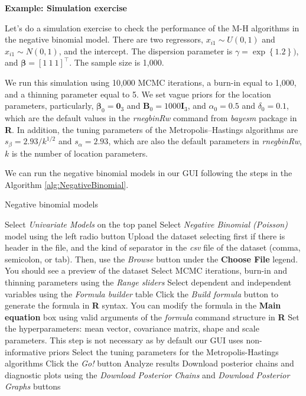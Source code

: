 \textbf{Example: Simulation exercise}

Let's do a simulation exercise to check the performance of the M-H algorithms in the negative binomial model. There are two regressors, $x_{i1}\sim U(0,1)$ and $x_{i1}\sim N(0,1)$, and the intercept. The dispersion parameter is $\gamma=\exp\left\{1.2\right\})$, and $\bm{\beta}=\left[1 \ 1 \ 1\right]^{\top}$. The sample size is 1,000.

We run this simulation using 10,000 MCMC iterations, a burn-in  equal to 1,000, and a thinning parameter equal to 5. We set vague priors for the location parameters, particularly,  $\bm{\beta}_0=\bm{0}_{3}$ and $\bm{B}_0=1000\bm{I}_{3}$, and $\alpha_0=0.5$ and $\delta_0=0.1$, which are the default values in the \textit{rnegbinRw} command from \textit{bayesm} package in \textbf{R}. In addition, the tuning parameters of the Metropolis--Hastings algorithms are $s_{\beta}=2.93/k^{1/2}$ and $s_{\alpha}=2.93$, which are also the default parameters in \textit{rnegbinRw}, $k$ is the number of location parameters.

We can run the negative binomial models in our GUI following the steps in the Algorithm \ref{alg:NegativeBinomial}.

\begin{algorithm}[h!]
	\caption{Negative binomial models}\label{alg:NegativeBinomial}
	\begin{algorithmic}[1]  		 			
		\State Select \textit{Univariate Models} on the top panel
		\State Select \textit{Negative Binomial (Poisson)} model using the left radio button
		\State Upload the dataset selecting first if there is header in the file, and the kind of separator in the \textit{csv} file of the dataset (comma, semicolon, or tab). Then, use the \textit{Browse} button under the \textbf{Choose File} legend. You should see a preview of the dataset
		\State Select MCMC iterations, burn-in and thinning parameters using the \textit{Range sliders}
		\State Select dependent and independent variables using the \textit{Formula builder} table
		\State Click the \textit{Build formula} button to generate the formula in \textbf{R} syntax. You can modify the formula in the \textbf{Main equation} box using valid arguments of the \textit{formula} command structure in \textbf{R}
		\State Set the hyperparameters: mean vector, covariance matrix, shape and scale parameters. This step is not necessary as by default our GUI uses non-informative priors
		\State Select the tuning parameters for the Metropolis-Hastings algorithms 
		\State Click the \textit{Go!} button
		\State Analyze results
		\State Download posterior chains and diagnostic plots using the \textit{Download Posterior Chains} and \textit{Download Posterior Graphs} buttons
	\end{algorithmic} 
\end{algorithm}

